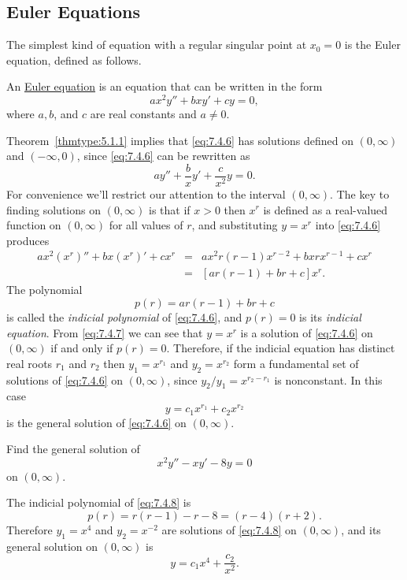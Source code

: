 \documentclass{ximera}
\begin{document}
\subsection*{Euler Equations}

The simplest kind of equation with a regular singular point at $x_0=0$
is the Euler equation, defined as follows.

\begin{definition}\label{thmtype:7.4.2}
An
\href{http://www-history.mcs.st-and.ac.uk/Mathematicians/Euler.html}{Euler equation} is an equation that can be written in the
form
\begin{equation} \label{eq:7.4.6}
ax^2y''+bxy'+cy=0,
\end{equation}
where $a,b$, and $c$ are real constants and $a\neq0$.
\end{definition}

Theorem~\ref{thmtype:5.1.1} implies that \eqref{eq:7.4.6} has
solutions defined on $(0,\infty)$ and $(-\infty,0)$,
since \eqref{eq:7.4.6} can be rewritten as
$$
ay''+\frac{b}{x}y'+\frac{c}{x^2}y=0.
$$
For convenience we'll restrict our attention to the interval
$(0,\infty)$. 
The key to finding solutions on
$(0,\infty)$ is  that if $x>0$ then $x^r$ is defined as a
real-valued function on $(0,\infty)$ for all values of $r$, and
substituting $y=x^r$ into \eqref{eq:7.4.6} produces
\begin{equation} \label{eq:7.4.7}
\begin{array}{lcl}
ax^2(x^r)''+bx(x^r)'+cx^r&=&ax^2r(r-1)x^{r-2}+bxrx^{r-1}+cx^r\\
&=&[ar(r-1)+br+c]x^r.
\end{array}
\end{equation}
The polynomial
$$
p(r)=ar(r-1)+br+c
$$
is called the \textit{indicial polynomial} of \eqref{eq:7.4.6}, and
$p(r)=0$
is its \textit{indicial equation}. From \eqref{eq:7.4.7} we can
see that
$y=x^r$ is a solution of \eqref{eq:7.4.6} on $(0,\infty)$ if and only if
$p(r)=0$. Therefore, if the indicial equation has distinct real roots
$r_1$ and $r_2$ then $y_1=x^{r_1}$ and $y_2=x^{r_2}$ form a
fundamental set of solutions of \eqref{eq:7.4.6} on
$(0,\infty)$, since $y_2/y_1=x^{r_2-r_1}$ is nonconstant.
In this case
$$
y=c_1x^{r_1}+c_2x^{r_2}
$$
is the general solution of \eqref{eq:7.4.6} on $(0,\infty)$.

\begin{example}\label{example:7.4.4}
 Find the general solution of
\begin{equation} \label{eq:7.4.8}
x^2y''-xy'-8y=0
\end{equation}
on  $(0,\infty)$.
\begin{explanation}
The indicial polynomial of \eqref{eq:7.4.8} is
$$
p(r)=r(r-1)-r-8=(r-4)(r+2).
$$
Therefore $y_1=x^4$ and $y_2=x^{-2}$ are solutions of \eqref{eq:7.4.8} on
$(0,\infty)$, and its general solution on $(0,\infty)$ is
$$
y=c_1x^4+\frac{c_2}{x^2}.
$$
\end{explanation}
\end{example}
\end{document}
